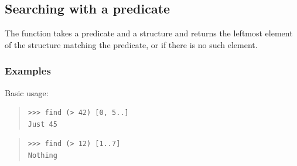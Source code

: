 \subsection{Searching with a predicate}
\begin{haddockdesc}
\item[\begin{tabular}{@{}l}
find :: Foldable t => (a -> Bool) -> t a -> Maybe a
\end{tabular}]
{\haddockbegindoc
The  function takes a predicate and a structure and returns
 the leftmost element of the structure matching the predicate, or
  if there is no such element.\par
\subsubsection*{\textbf{Examples}}
Basic usage:\par
\begin{quote}
{\haddockverb\begin{verbatim}
>>> find (> 42) [0, 5..]
Just 45

\end{verbatim}}
\end{quote}
\begin{quote}
{\haddockverb\begin{verbatim}
>>> find (> 12) [1..7]
Nothing

\end{verbatim}}
\end{quote}}
\end{haddockdesc}
